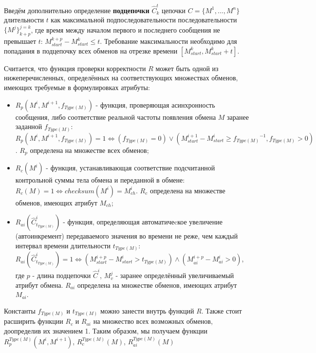 Введём дополнительно определение \textbf{подцепочки} $\hat{C}^t_k$ цепочки $C = 
\{M^1, ..., M^n\}$ длительности $t$ как максимальной подпоследовательности 
последовательности $\{M^j\}^{j=k}_{k+p}$, где время между началом первого и 
последнего сообщения не превышает $t$: $M^{k+p}_{start} - M^k_{start} \leq t$. 
Требование максимальности необходимо для попадания в подцепочку всех обменов на 
отрезке времени $[M^k_{start}, M^k_{start}+ t]$.

Считается, что функция проверки корректности $R$ может быть одной из 
нижеперечисленных, определённых на соответствующих множествах обменов, 
имеющих требуемые в формулировках атрибуты:

\begin{itemize}
 \item $R_p(M^i, M^{i+1}, f_{Type(M)})$ - функция, проверяющая асинхронность 
сообщения, либо соответствие реальной частоты появления обмена $M$ заранее 
заданной $f_{Type(M)}$: $R_p(M^i, M^{i+1}, f_{Type(M)}) = 1 \Leftrightarrow 
(f_{Type(M)} = 0) \vee (M^{i+1}_{start} - M^i_{start} \geq 
{f_{Type(M)}}^{-1}, f_{Type(M)} > 0)$. $R_p$ определена на множестве всех 
обменов;

 \item $R_c(M^i)$ - функция, устанавливающая соответствие подсчитанной 
контрольной суммы тела обмена и переданной в обмене: $R_c(M) = 1 
\Leftrightarrow checksum(M^i) = M^i_{ch}$. $R_c$ определена на множестве 
обменов, имеющих атрибут $M_{ch}$;

 \item $R_{ai}(\hat{C}^i_{t_{Type(M)}})$ - функция, определяющая 
автоматичеcкое увеличение (автоинкремент) передаваемого значения во 
времени не реже, чем каждый интервал времени длительности $t_{Type(M)}$: 
$R_{ai}(\hat{C}^i_{t_{Type(M)}}) = 1 \Leftrightarrow (M^{i+p}_{start} - 
M^i_{start} > t_{Type(M)}) \wedge (M^{i+p}_{ai} - M^i_{ai} > 0)$, где $p$ - 
длина подцепочки $\hat{C}^i$, $M^j_v$ - заранее определённый увеличиваемый 
атрибут обмена. $R_{ai}$ определена на множестве обменов, имеющих атрибут 
$M_{ai}$.
\end{itemize}

Константы $f_{Type(M)}$ и $t_{Type(M)}$ можно занести внутрь функций $R$. Также 
стоит расширить функции $R_c$ и $R_{ai}$ на множество всех возможных обменов, 
доопределив их значением 1. Таким образом, мы получаем функции 
$R^{Type(M)}_p(M^{i}, M^{i+1})$, $R^{Type(M)}_c(M)$, $R^{Type(M)}_{ai}(M)$

